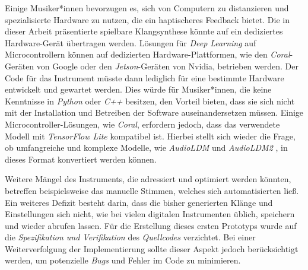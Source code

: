 \documentclass[
  a4paper,  %
  twoside,  %
  bibliography=totoc,
  headsepline,
  cleardoublepage=empty,
  parskip=half,
  draft=false
]{scrbook}
\begin{document}
Einige Musiker*innen bevorzugen es, sich von Computern zu distanzieren und spezialisierte Hardware zu nutzen, die ein haptischeres Feedback bietet. Die in dieser Arbeit präsentierte spielbare Klangsynthese könnte auf ein dediziertes Hardware-Gerät übertragen werden. Lösungen für \emph{Deep Learning} auf Microcontrollern \cite{saha_machine_2022} können auf dedizierten Hardware-Plattformen, wie den \emph{Coral}-Geräten \cite{noauthor_coral_nodate} von Google oder den \emph{Jetson}-Geräten \cite{noauthor_jetson_nodate} von Nvidia, betrieben werden. Der Code für das Instrument müsste dann lediglich für eine bestimmte Hardware entwickelt und gewartet werden. Dies würde für Musiker*innen, die keine Kenntnisse in \emph{Python} oder \emph{C++} besitzen, den Vorteil bieten, dass sie sich nicht mit der Installation und Betreiben der Software auseinandersetzen müssen. Einige Microcontroller-Lösungen, wie \emph{Coral}, erfordern jedoch, dass das verwendete Modell mit \emph{TensorFlow Lite} \cite{noauthor_tensorflow_nodate} kompatibel ist. Hierbei stellt sich wieder die Frage, ob umfangreiche und komplexe Modelle, wie \emph{AudioLDM} \cite{liu_audioldm_2023} und \emph{AudioLDM2} \cite{liu_audioldm2_2023}, in dieses Format konvertiert werden können.

Weitere Mängel des Instruments, die adressiert und optimiert werden könnten, betreffen beispielsweise das manuelle Stimmen, welches sich automatisierten ließ. Ein weiteres Defizit besteht darin, dass die bisher generierten Klänge und Einstellungen sich nicht, wie bei vielen digitalen Instrumenten üblich, speichern und wieder abrufen lassen. Für die Erstellung dieses ersten Prototyps wurde auf die \emph{Spezifikation und Verifikation} des \emph{Quellcodes} verzichtet. Bei einer Weiterverfolgung der Implementierung sollte dieser Aspekt jedoch berücksichtigt werden, um potenzielle \emph{Bugs} und Fehler im Code zu minimieren.
\end{document}
